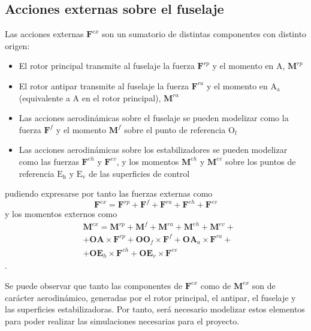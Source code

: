 \subsection{Acciones externas sobre el fuselaje}
Las acciones externas $\mathrm{\textbf{F}}^{ex}$ son un sumatorio de distintas componentes con distinto origen:
\begin{itemize}
	\item El rotor principal transmite al fuselaje la fuerza $\mathrm{\textbf{F}}^{rp}$ y el momento en $\mathrm{A}$, $\mathrm{\textbf{M}}^{rp}$
	\item El rotor antipar transmite al fuselaje la fuerza $\mathrm{\textbf{F}}^{ra}$ y el momento en $\mathrm{A_a}$ (equivalente a A en el rotor principal), $\mathrm{\textbf{M}}^{ra}$
	\item Las acciones aerodinámicas sobre el fuselaje se pueden modelizar como la fuerza $\mathrm{\textbf{F}}^{f}$ y el momento $\mathrm{\textbf{M}}^{f}$ sobre el punto de referencia $\mathrm{O_f}$
	\item Las acciones aerodinámicas sobre los estabilizadores se pueden modelizar como las fuerzas $\mathrm{\textbf{F}}^{eh}$ y $\mathrm{\textbf{F}}^{ev}$, y los momentos $\mathrm{\textbf{M}}^{eh}$ y $\mathrm{\textbf{M}}^{ev}$ sobre los puntos de referencia $\mathrm{E_h}$ y $\mathrm{E_v}$ de las superficies de control
\end{itemize}
pudiendo expresarse por tanto las fuerzas externas como
\begin{equation}
	\mathrm{\textbf{F}}^{ex}=\mathrm{\textbf{F}}^{rp}+\mathrm{\textbf{F}}^{f}+\mathrm{\textbf{F}}^{ra}+\mathrm{\textbf{F}}^{eh}+\mathrm{\textbf{F}}^{ev}
\end{equation}
y los momentos externos como
\begin{equation}
\begin{split}
	&\mathrm{\textbf{M}}^{ex}=\mathrm{\textbf{M}}^{rp}+\mathrm{\textbf{M}}^{f}+\mathrm{\textbf{M}}^{ra}+\mathrm{\textbf{M}}^{eh}+\mathrm{\textbf{M}}^{ev}+ \\
	&+\textbf{OA} \times \mathrm{\textbf{F}}^{rp}+\textbf{O}\textbf{O}_f \times \mathrm{\textbf{F}}^{f}+\textbf{OA}_a \times \mathrm{\textbf{F}}^{ra}+\\
	&+\textbf{OE}_h \times \mathrm{\textbf{F}}^{eh}+\textbf{OE}_v \times \mathrm{\textbf{F}}^{ev}
\end{split}
\end{equation}.

Se puede observar que tanto las componentes de $\mathrm{\textbf{F}}^{ex}$ como de $\mathrm{\textbf{M}}^{ex}$ son de carácter aerodinámico, generadas por el rotor principal, el antipar, el fuselaje y las superficies estabilizadoras. Por tanto, será necesario modelizar estos elementos para poder realizar las simulaciones necesarias para el proyecto.

